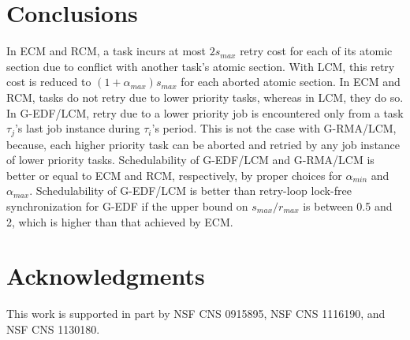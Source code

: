 \documentclass{sig-alternate}
\begin{document}
\section{Conclusions}
\label{sec:conclusions_lcm}

In ECM and RCM, a task incurs at most $2s_{max}$ retry cost for each of its atomic section due to conflict
with another task's atomic section. With LCM, this retry cost is reduced to $(1+\alpha_{max})s_{max}$ for each aborted atomic section. In ECM and RCM, tasks do not retry due to lower priority tasks, whereas in LCM, they do so. In G-EDF/LCM, retry due to a lower priority job is encountered only from a task $\tau_{j}$'s last job instance 
during $\tau_{i}$'s period. This is not the case with G-RMA/LCM, because,  each higher priority task can be aborted and retried by any job instance of lower priority tasks. Schedulability of G-EDF/LCM and G-RMA/LCM is better or equal to ECM and RCM, respectively, by proper choices for $\alpha_{min}$ and $\alpha_{max}$. Schedulability of G-EDF/LCM is better than retry-loop lock-free synchronization for G-EDF if the upper bound on $s_{max}/r_{max}$ is between 0.5 and 2, which is higher than that achieved by ECM.

\section*{Acknowledgments}
\label{sec:ack}
This work is supported in part by NSF CNS 0915895, NSF CNS 1116190,  and NSF CNS 1130180.

%
%
\end{document}
